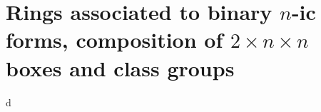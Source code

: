 
\section{Rings associated to binary \texorpdfstring{$n$}{n}-ic forms, composition of \texorpdfstring{$2\times n\times n$}{2*n*n} boxes and class groups}





d


